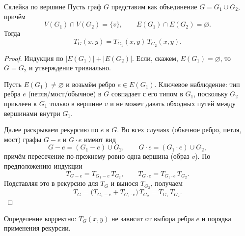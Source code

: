 \begin{Lemma}{Склейка по вершине}{}
	Пусть граф $G$ представим как объединение $G=G_1\cup G_2$, причём
	\[
	V(G_1)\cap V(G_2)=\{v\},\qquad E(G_1)\cap E(G_2)=\varnothing.
	\]
	Тогда
	\[
	T_G(x,y)=T_{G_1}(x,y)\,T_{G_2}(x,y).
	\]
\end{Lemma}

\begin{proof}
	Индукция по $|E(G_1)|+|E(G_2)|$.
	Если, скажем, $E(G_1)=\varnothing$, то $G=G_2$ и утверждение тривиально.
	
	Пусть $E(G_1)\neq\varnothing$ и возьмём ребро $e\in E(G_1)$.
	Ключевое наблюдение: тип ребра $e$ (петля/мост/обычное) в $G$ совпадает с его типом в $G_1$,
	поскольку $G_2$ приклеен к $G_1$ только в вершине $v$ и не может давать обходных путей
	между вершинами внутри $G_1$.
	
	Далее раскрываем рекурсию по $e$ в $G$.
	Во всех случаях (обычное ребро, петля, мост) графы $G-e$ и $G\cdot e$ имеют вид
	\[
	G-e=(G_1-e)\cup G_2,\qquad G\cdot e=(G_1\cdot e)\cup G_2,
	\]
	причём пересечение по-прежнему ровно одна вершина (образ $v$).
	По предположению индукции
	\[
	T_{G-e}=T_{G_1-e}\,T_{G_2},\qquad T_{G\cdot e}=T_{G_1\cdot e}\,T_{G_2}.
	\]
	Подставляя это в рекурсию для $T_G$ и вынося $T_{G_2}$, получаем
	\[
	T_G=\bigl(T_{G_1-e}+T_{G_1\cdot e}\bigr)\,T_{G_2}=T_{G_1}\,T_{G_2}.
	\]
\end{proof}

\begin{Proposition}{}{}
	Определение корректно: $T_G(x,y)$ не зависит от выбора ребра $e$ и порядка применения рекурсии.
\end{Proposition}

